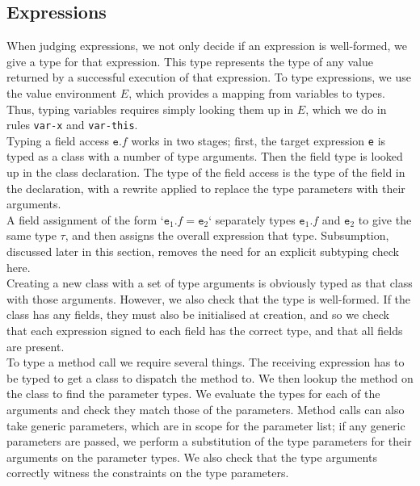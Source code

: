 \subsection{Expressions}

When judging expressions, we not only decide if an expression is well-formed, we give a type for that expression. This type represents the type of any value returned by a successful execution of that expression. To type expressions, we use the value environment $E$, which provides a mapping from variables to types. Thus, typing variables requires simply looking them up in $E$, which we do in rules \texttt{var-x} and \texttt{var-this}. \\

Typing a field access $\texttt{e}.f$ works in two stages; first, the target expression \texttt{e} is typed as a class with a number of type arguments. Then the field type is looked up in the class declaration. The type of the field access is the type of the field in the declaration, with a rewrite applied to replace the type parameters with their arguments. \\

A field assignment of the form `$\texttt{e}_1.f = \texttt{e}_2$` separately types $\texttt{e}_1.f$ and $\texttt{e}_2$ to give the same type $\tau$, and then assigns the overall expression that type. Subsumption, discussed later in this section, removes the need for an explicit subtyping check here. \\

Creating a new class with a set of type arguments is obviously typed as that class with those arguments. However, we also check that the type is well-formed. If the class has any fields, they must also be initialised at creation, and so we check that each expression signed to each field has the correct type, and that all fields are present. \\

To type a method call we require several things. The receiving expression has to be typed to get a class to dispatch the method to. We then lookup the method on the class to find the parameter types. We evaluate the types for each of the arguments and check they match those of the parameters. Method calls can also take generic parameters, which are in scope for the parameter list; if any generic parameters are passed, we perform a substitution of the type parameters for their arguments on the parameter types. We also check that the type arguments correctly witness the constraints on the type parameters. \\


